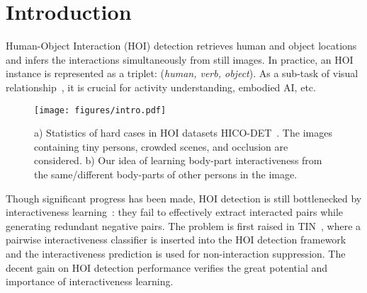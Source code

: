 \documentclass[runningheads]{llncs}
\begin{document}
\section{Introduction}\label{sec:intro}

Human-Object Interaction (HOI) detection retrieves human and object locations and infers the interactions simultaneously from still images. In practice, an HOI instance is represented as a triplet: (\textit{human, verb, object}). As a sub-task of visual relationship~\cite{visualgenome,Lu2016Visual}, 
it is crucial for activity understanding, embodied AI, etc. 

\begin{figure}
\centering
\texttt{[image: figures/intro.pdf]}
\caption{
a) Statistics of hard cases in HOI datasets HICO-DET~\cite{hicodet}. 
The images containing tiny persons, crowded scenes, and occlusion are considered.
b) Our idea of learning body-part interactiveness from the same/different body-parts of other persons in the image.
}
\label{fig:intro} 
\end{figure}

Though significant progress has been made, HOI detection is still bottlenecked by interactiveness learning~\cite{li2019transferable}: they fail to effectively extract interacted pairs while generating redundant negative pairs. 
The problem is first raised in TIN~\cite{li2019transferable}, where a pairwise interactiveness classifier is inserted into the HOI detection framework and the interactiveness prediction is used for non-interaction suppression. The decent gain on HOI detection performance verifies the great potential and importance of interactiveness learning.
\end{document}
